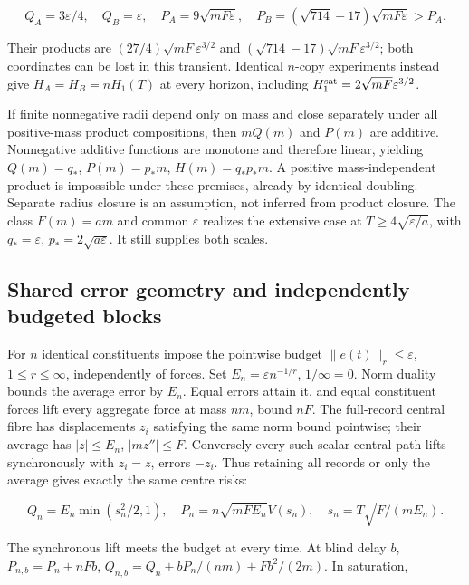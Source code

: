 \documentclass[11pt,a4paper]{article}
\begin{document}
\[Q_A=3\varepsilon/4,\quad Q_B=\varepsilon,\quad
P_A=9\sqrt{mF\varepsilon},\quad
P_B=(\sqrt{714}-17)\sqrt{mF\varepsilon}>P_A.\]

Their products are \((27/4)\sqrt{mF}\varepsilon^{3/2}\) and
\((\sqrt{714}-17)\sqrt{mF}\varepsilon^{3/2}\); both coordinates can be
lost in this transient. Identical \(n\)-copy experiments instead give
\(H_A=H_B=nH_1(T)\) at every horizon, including
\(H_1^{\rm sat}=2\sqrt{mF}\varepsilon^{3/2}\).

If finite nonnegative radii depend only on mass and close separately
under all positive-mass product compositions, then \(mQ(m)\) and
\(P(m)\) are additive. Nonnegative additive functions are monotone and
therefore linear, yielding \(Q(m)=q_*\), \(P(m)=p_*m\),
\(H(m)=q_*p_*m\). A positive mass-independent product is impossible
under these premises, already by identical doubling. Separate radius
closure is an assumption, not inferred from product closure. The class
\(F(m)=a m\) and common \(\varepsilon\) realizes the extensive case at
\(T\ge4\sqrt{\varepsilon/a}\), with \(q_*=\varepsilon\),
\(p_*=2\sqrt{a\varepsilon}\). It still supplies both scales.

\hypertarget{shared-error-geometry-and-independently-budgeted-blocks}{%
\subsection{Shared error geometry and independently budgeted
blocks}\label{shared-error-geometry-and-independently-budgeted-blocks}}

For \(n\) identical constituents impose the pointwise budget
\(\|e(t)\|_r\le\varepsilon\), \(1\le r\le\infty\), independently of
forces. Set \(E_n=\varepsilon n^{-1/r}\), \(1/\infty=0\). Norm duality
bounds the average error by \(E_n\). Equal errors attain it, and equal
constituent forces lift every aggregate force at mass \(nm\), bound
\(nF\). The full-record central fibre has displacements \(z_i\)
satisfying the same norm bound pointwise; their average has
\(|z|\le E_n\), \(|mz''|\le F\). Conversely every such scalar central
path lifts synchronously with \(z_i=z\), errors \(-z_i\). Thus retaining
all records or only the average gives exactly the same centre risks:

\[Q_n=E_n\min(s_n^2/2,1),\quad
P_n=n\sqrt{mFE_n}V(s_n),\quad s_n=T\sqrt{F/(mE_n)}.\]

The synchronous lift meets the budget at every time. At blind delay
\(b\), \(P_{n,b}=P_n+nFb\), \(Q_{n,b}=Q_n+bP_n/(nm)+Fb^2/(2m)\). In
saturation,
\end{document}
